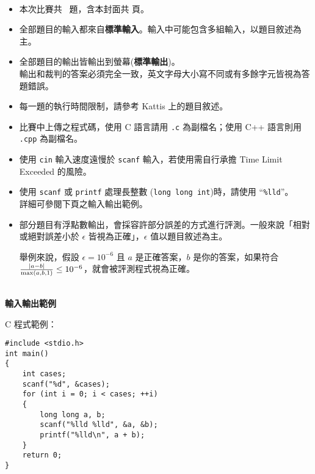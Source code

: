 \begin{center}
	\LARGE \bf
    \NPSCYear \ContestName\\
    \NPSCGroup\NPSCContest
\end{center}


\begin{itemize}
    \item 本次比賽共 \NPSCProblemAmount\ 題，含本封面共 \pageref{LastPage} 頁。

    \item 全部題目的輸入都來自{\bf 標準輸入}。輸入中可能包含多組輸入，以題目敘述為主。

    \item 全部題目的輸出皆輸出到螢幕({\bf 標準輸出})。\\
          輸出和裁判的答案必須完全一致，英文字母大小寫不同或有多餘字元皆視為答題錯誤。

    \item 每一題的執行時間限制，請參考 Kattis 上的題目敘述。

    \item 比賽中上傳之程式碼，使用 C 語言請用 \texttt{.c} 為副檔名；使用 C++ 語言則用 \texttt{.cpp} 為副檔名。

    \item 使用 \texttt{cin} 輸入速度遠慢於 \texttt{scanf} 輸入，若使用需自行承擔 Time Limit Exceeded 的風險。

    \item 使用 \texttt{scanf} 或 \texttt{printf} 處理長整數 (\texttt{long long int})時，請使用 ``\texttt{\%lld}''。\\
            詳細可參閱下頁之輸入輸出範例。

    \item 部分題目有浮點數輸出，會採容許部分誤差的方式進行評測。一般來說「相對或絕對誤差小於 $\epsilon$ 皆視為正確」，$\epsilon$ 值以題目敘述為主。

        舉例來說，假設 $\epsilon = 10^{-6}$ 且 $a$ 是正確答案，$b$ 是你的答案，如果符合 $\frac{\lvert a - b\rvert}{\max(a, b, 1)} \leq 10^{-6}$，就會被評測程式視為正確。

\end{itemize}



\clearpage

\begin{center}
    \LARGE \bf
    \NPSCYear \ContestName\\
    輸入輸出範例
\end{center}


C 程式範例：
\begin{lstlisting}[frame=single]
#include <stdio.h>
int main()
{
    int cases;
    scanf("%d", &cases);
    for (int i = 0; i < cases; ++i)
    {
        long long a, b;
        scanf("%lld %lld", &a, &b);
        printf("%lld\n", a + b);
    }
    return 0;
}
\end{lstlisting}

